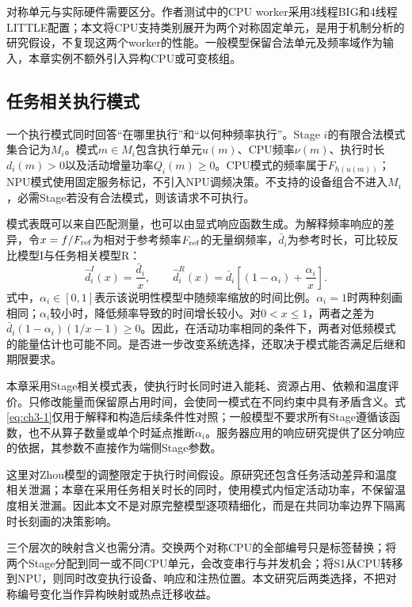 对称单元与实际硬件需要区分。作者测试中的CPU worker采用3线程BIG和4线程LITTLE配置\cite{source5}；本文将CPU支持类别展开为两个对称固定单元，是用于机制分析的研究假设，不复现这两个worker的性能。一般模型保留合法单元及频率域作为输入，本章实例不额外引入异构CPU或可变核组。

\subsection{任务相关执行模式}

一个执行模式同时回答“在哪里执行”和“以何种频率执行”。Stage \(i\)的有限合法模式集合记为\(M_i\)。模式\(m\in M_i\)包含执行单元\(u(m)\)、CPU频率\(\nu(m)\)、执行时长\(d_i(m)>0\)以及活动增量功率\(Q_i(m)\ge0\)。CPU模式的频率属于\(F_{h(u(m))}\)；NPU模式使用固定服务标记，不引入NPU调频决策。不支持的设备组合不进入\(M_i\)，必需Stage若没有合法模式，则该请求不可执行。

模式表既可以来自匹配测量，也可以由显式响应函数生成。为解释频率响应的差异，令\(x=f/F_{\rm ref}\)为相对于参考频率\(F_{\rm ref}\)的无量纲频率，\(\bar d_i\)为参考时长，可比较反比模型I与任务相关模型R：
\begin{equation}
\widehat d_i^I(x)=\frac{\bar d_i}{x},\qquad
\widehat d_i^R(x)=\bar d_i\left[(1-\alpha_i)+\frac{\alpha_i}{x}\right].
\label{eq:ch3-1}
\end{equation}
式中，\(\alpha_i\in[0,1]\)表示该说明性模型中随频率缩放的时间比例。\(\alpha_i=1\)时两种刻画相同；\(\alpha_i\)较小时，降低频率导致的时间增长较小。对\(0<x\le1\)，两者之差为\(\bar d_i(1-\alpha_i)(1/x-1)\ge0\)。因此，在活动功率相同的条件下，两者对低频模式的能量估计也可能不同。是否进一步改变系统选择，还取决于模式能否满足后继和期限要求。

本章采用Stage相关模式表，使执行时长同时进入能耗、资源占用、依赖和温度评价。只修改能量而保留原占用时间，会使同一模式在不同约束中具有矛盾含义。式\eqref{eq:ch3-1}仅用于解释和构造后续条件性对照；一般模型不要求所有Stage遵循该函数，也不从算子数量或单个时延点推断\(\alpha_i\)。服务器应用的响应研究\cite{source2}提供了区分响应的依据，其参数不直接作为端侧Stage参数。

这里对Zhou模型的调整限定于执行时间假设。原研究还包含任务活动差异和温度相关泄漏\cite{source1}；本章在采用任务相关时长的同时，使用模式内恒定活动功率，不保留温度相关泄漏。因此本文不是对原完整模型逐项精细化，而是在共同功率边界下隔离时长刻画的决策影响。

三个层次的映射含义也需分清。交换两个对称CPU的全部编号只是标签替换；将两个Stage分配到同一或不同CPU单元，会改变串行与并发机会；将S1从CPU转移到NPU，则同时改变执行设备、响应和注热位置。本文研究后两类选择，不把对称编号变化当作异构映射或热点迁移收益。

